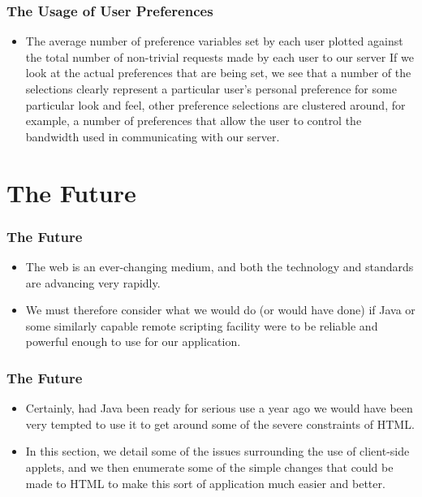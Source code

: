 \documentclass{beamer}
\begin{document}
\begin{frame}
\frametitle{The Usage of User Preferences}

\begin{itemize}
\item The average number of preference variables set by each user plotted against the total number of non-trivial requests made by each user to our server If we look at the actual preferences that are being set, we see that a number of the selections clearly represent a particular user's personal preference for some particular look and feel, other preference selections are clustered around, for example, a number of preferences that allow the user to control the bandwidth used in communicating with our server.
\end{itemize}

\end{frame}

\section[The Future]{The Future}


\begin{frame}
\frametitle{The Future}

\begin{itemize}
\item The web is an ever-changing medium, and both the technology and standards are advancing very rapidly.
\item We must therefore consider what we would do (or would have done) if Java or some similarly capable remote scripting facility were to be reliable and powerful enough to use for our application.
\end{itemize}

\end{frame}

\begin{frame}
\frametitle{The Future}

\begin{itemize}
\item Certainly, had Java been ready for serious use a year ago we would have been very tempted to use it to get around some of the severe constraints of HTML.
\item In this section, we detail some of the issues surrounding the use of client-side applets, and we then enumerate some of the simple changes that could be made to HTML to make this sort of application much easier and better.
\end{itemize}

\end{frame}
\end{document}
